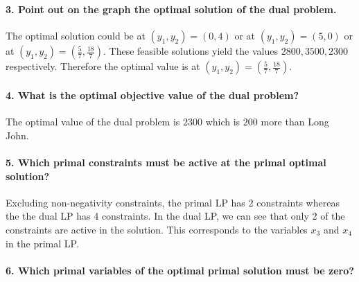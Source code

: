 \documentclass[11pt]{article}
\begin{document}
    \begin{center}
    \end{center}
    { \hspace*{\fill} \\}
    
    \hypertarget{point-out-on-the-graph-the-optimal-solution-of-the-dual-problem.}{%
\paragraph{3. Point out on the graph the optimal solution of the dual
problem.}\label{point-out-on-the-graph-the-optimal-solution-of-the-dual-problem.}}

The optimal solution could be at \((y_1,y_2) = (0,4)\) or at
\((y_1,y_2) = (5,0)\) or at \((y_1, y_2) = (\frac{5}{7},\frac{18}{7})\).
These feasible solutions yield the values \(2800, 3500, 2300\)
respectively. Therefore the optimal value is at
\((y_1, y_2) = (\frac{5}{7},\frac{18}{7})\).

    \hypertarget{what-is-the-optimal-objective-value-of-the-dual-problem}{%
\paragraph{4. What is the optimal objective value of the dual
problem?}\label{what-is-the-optimal-objective-value-of-the-dual-problem}}

The optimal value of the dual problem is \(2300\) which is \(200\) more
than Long John.

    \hypertarget{which-primal-constraints-must-be-active-at-the-primal-optimal-solution}{%
\paragraph{5. Which primal constraints must be active at the primal
optimal
solution?}\label{which-primal-constraints-must-be-active-at-the-primal-optimal-solution}}

Excluding non-negativity constraints, the primal LP has 2 constraints
whereas the the dual LP has 4 constraints. In the dual LP, we can see
that only 2 of the constraints are active in the solution. This
corresponds to the variables \(x_3\) and \(x_4\) in the primal LP.

    \hypertarget{which-primal-variables-of-the-optimal-primal-solution-must-be-zero}{%
\paragraph{6. Which primal variables of the optimal primal solution must
be
zero?}\label{which-primal-variables-of-the-optimal-primal-solution-must-be-zero}}
\end{document}

